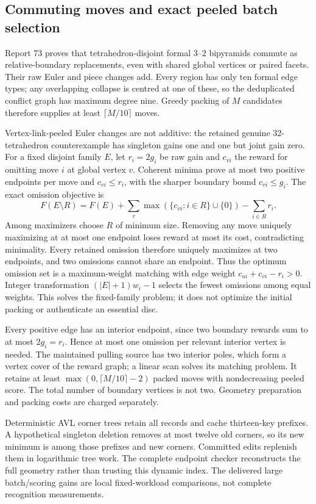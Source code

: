 \subsection{Commuting moves and exact peeled batch selection}

Report 73 proves that tetrahedron-disjoint formal $3$--$2$ bipyramids commute
as relative-boundary replacements, even with shared global vertices or
paired facets. Their raw Euler and piece changes add. Every region has only
ten formal edge types; any overlapping collapse is centred at one of these,
so the deduplicated conflict graph has maximum degree nine. Greedy packing
of $M$ candidates therefore supplies at least $\lceil M/10\rceil$ moves.

Vertex-link-peeled Euler changes are not additive: the retained genuine
32-tetrahedron counterexample has singleton gains one and one but joint gain
zero. For a fixed disjoint family $E$, let $r_i=2g_i$ be raw gain and
$c_{vi}$ the reward for omitting move $i$ at global vertex $v$. Coherent
minima prove at most two positive endpoints per move and
$c_{vi}\le r_i$, with the sharper boundary bound $c_{vi}\le g_i$.
The exact omission objective is
\[
 F(E\setminus R)=F(E)+
 \sum_v\max(\{c_{vi}:i\in R\}\cup\{0\})-\sum_{i\in R}r_i.
\]
Among maximizers choose $R$ of minimum size. Removing any move uniquely
maximizing at at most one endpoint loses reward at most its cost, contradicting
minimality. Every retained omission therefore uniquely maximizes at two
endpoints, and two omissions cannot share an endpoint. Thus the optimum
omission set is a maximum-weight matching with edge weight
$c_{ui}+c_{vi}-r_i>0$. Integer transformation $(|E|+1)w_i-1$ selects the
fewest omissions among equal weights. This solves the fixed-family problem;
it does not optimize the initial packing or authenticate an essential disc.

Every positive edge has an interior endpoint, since two boundary rewards
sum to at most $2g_i=r_i$. Hence at most one omission per relevant interior
vertex is needed. The maintained pulling source has two interior poles,
which form a vertex cover of the reward graph; a linear scan solves its
matching problem. It retains at least
$\max(0,\lceil M/10\rceil-2)$ packed moves with nondecreasing peeled score.
The total number of boundary vertices is not two. Geometry preparation and
packing costs are charged separately.

Deterministic AVL corner trees retain all records and cache thirteen-key
prefixes. A hypothetical singleton deletion removes at most twelve old
corners, so its new minimum is among those prefixes and new corners.
Committed edits replenish them in logarithmic tree work. The complete
endpoint checker reconstructs the full geometry rather than trusting this
dynamic index. The delivered large batch/scoring gains are local fixed-workload
comparisons, not complete recognition measurements.

